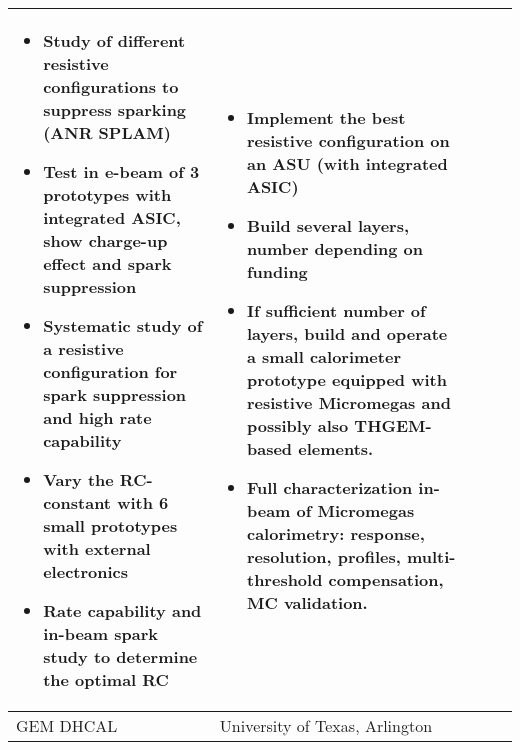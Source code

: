 \begin{landscape}
\begin{adjustbox}{max width=1\textheight,totalheight=1\textwidth}
\begin{tabularx}{2\textheight}{lXXXX}
\begin{itemize}
          \item Study of different resistive configurations to suppress sparking (ANR SPLAM)
          \item Test in e-beam of 3 prototypes with integrated ASIC, show charge-up effect and spark suppression
          \item Systematic study of a resistive configuration for spark suppression and high rate capability
          \item Vary the RC-constant with 6 small prototypes with external electronics
          \item Rate capability and in-beam spark study to determine the optimal RC
      \end{itemize} %
       &
       \begin{itemize}
           \item Implement the best resistive configuration on an ASU (with integrated ASIC)
           \item Build several layers, number depending on funding
           \item If sufficient number of layers, build and operate a small calorimeter prototype equipped with resistive Micromegas and possibly also THGEM-based elements.
           \item Full characterization in-beam of Micromegas calorimetry:
           response, resolution, profiles, multi-threshold compensation, MC validation.
       \end{itemize}
 \\
       \midrule
    GEM DHCAL &
     University of Texas, Arlington &                                                                                                                                                                                                                                                                                                                                                                                      &                                                                                                                                                                                                                                                                 &                                                                                                                                                                                                                                     \\

\end{tabularx}
\end{adjustbox}
\end{landscape}
